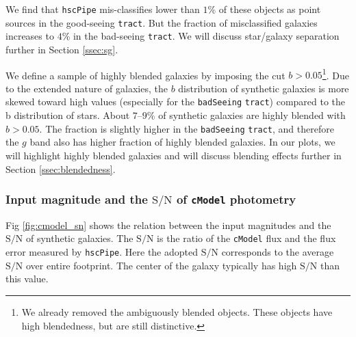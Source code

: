 \documentclass[useamsfonts]{pasj01}
\def\asec{$^{\prime\prime}$}
\def\hscpipe{\texttt{hscPipe}}
\def\cmodel{\texttt{cModel}}
\def\tract{\texttt{tract}}
\def\s2n{{$\mathrm{S}/\mathrm{N}$}}
\begin{document}
    We find that \hscpipe{} mis-classifies lower than $1$\% of these objects as 
    point sources in the good-seeing \tract{}.
    But the fraction of misclassified galaxies increases to $4$\% in the
    bad-seeing \tract{}. 
    We will discuss star/galaxy separation further in Section \ref{ssec:sg}.

    We define a sample of highly blended galaxies by imposing the cut 
    $b>0.05$\footnote{We already removed the ambiguously blended objects. 
    These objects have high blendedness, but are still distinctive.}.
    Due to the extended nature of galaxies, the $b$ distribution of synthetic 
    galaxies is more skewed toward high values (especially for the \texttt{badSeeing}
    \tract{}) compared to the b distribution of stars.
    About $7$--$9$\% of synthetic galaxies are highly blended with $b>0.05$.
    The fraction is slightly higher in the \texttt{badSeeing} \tract{}, and 
    therefore the $g$ band also has higher fraction of highly blended galaxies.
    In our plots, we will highlight highly blended galaxies and will discuss 
    blending effects further in Section \ref{ssec:blendedness}.


\subsubsection{Input magnitude and the \s2n{} of \cmodel{} photometry}

    Fig \ref{fig:cmodel_sn} shows the relation between the input magnitudes and the 
    \s2n{} of synthetic galaxies.  
    The \s2n{} is the ratio  of the \cmodel{} flux and the flux error measured by 
    \hscpipe{}.
    Here the adopted \s2n{} corresponds to the average \s2n{} over entire footprint. 
    The center of the galaxy typically has high \s2n{} than this value.    
\end{document}
